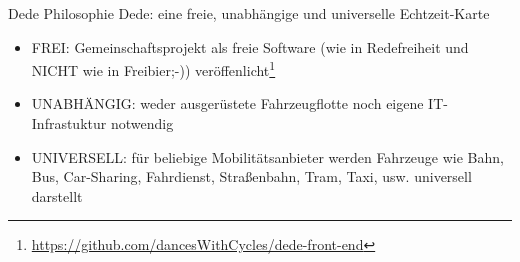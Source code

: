 
\begin{frame}{Dede Philosophie}
  Dede: eine freie, unabhängige und universelle Echtzeit-Karte
  \begin{itemize}
  \item FREI: Gemeinschaftsprojekt als freie Software (wie in Redefreiheit und NICHT wie in Freibier;-)) veröffenlicht\footnote{\url{https://github.com/dancesWithCycles/dede-front-end}}
  \item UNABHÄNGIG: weder ausgerüstete Fahrzeugflotte noch eigene IT-Infrastuktur notwendig
  \item UNIVERSELL: für beliebige Mobilitätsanbieter werden Fahrzeuge wie Bahn, Bus, Car-Sharing, Fahrdienst, Straßenbahn, Tram, Taxi, usw. universell darstellt
  \end{itemize}
\end{frame}
